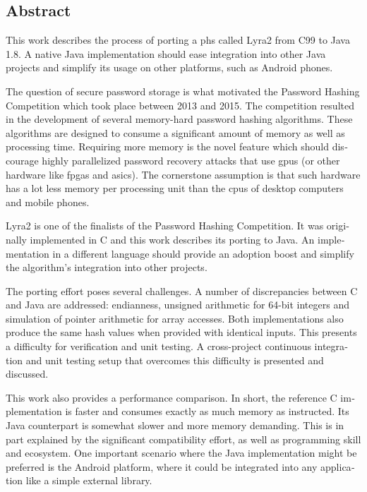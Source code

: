 \cleardoublepage
{}

\begin{otherlanguage}{english}
\chapter*{Abstract}

This work describes the process of porting a \gls{phs} called Lyra2 from C99 to Java 1.8. A native Java implementation should ease integration into other Java projects and simplify its usage on other platforms, such as Android phones.

The question of secure password storage is what motivated the Password Hashing Competition which took place between 2013 and 2015. The competition resulted in the development of several memory-hard password hashing algorithms. These algorithms are designed to consume a significant amount of memory as well as processing time. Requiring more memory is the novel feature which should discourage highly parallelized password recovery attacks that use \glspl{gpu} (or other hardware like \glspl{fpga} and \glspl{asic}). The cornerstone assumption is that such hardware has a lot less memory per processing unit than the \glspl{cpu} of desktop computers and mobile phones.

Lyra2 is one of the finalists of the Password Hashing Competition. It was originally implemented in C and this work describes its porting to Java. An implementation in a different language should provide an adoption boost and simplify the algorithm's integration into other projects.

The porting effort poses several challenges. A number of discrepancies between C and Java are addressed: endianness, unsigned arithmetic for 64-bit integers and simulation of pointer arithmetic for array accesses. Both implementations also produce the same hash values when provided with identical inputs. This presents a difficulty for verification and unit testing. A cross-project continuous integration and unit testing setup that overcomes this difficulty is presented and discussed.

This work also provides a performance comparison. In short, the reference C implementation is faster and consumes exactly as much memory as instructed. Its Java counterpart is somewhat slower and more memory demanding. This is in part explained by the significant compatibility effort, as well as programming skill and ecosystem. One important scenario where the Java implementation might be preferred is the Android platform, where it could be integrated into any application like a simple external library.


\end{otherlanguage}
